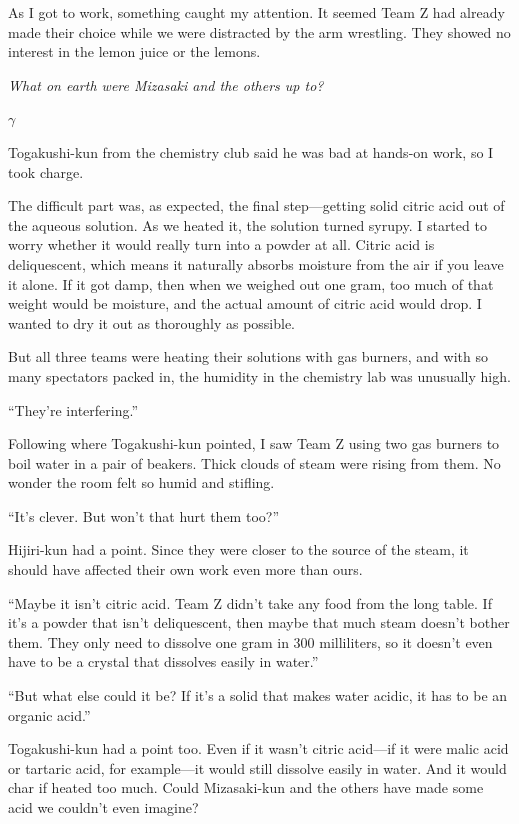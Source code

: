 \documentclass[
    a4paper,
    12pt,
    twoside,
    openany,
    UTF8,
    fontset=windows
]{ctexbook}
\begin{document}
As I got to work, something caught my attention. It seemed Team Z had already made their choice while we were distracted by the arm wrestling. They showed no interest in the lemon juice or the lemons.

\textit{What on earth were Mizasaki and the others up to?}

$\gamma$

Togakushi-kun from the chemistry club said he was bad at hands-on work, so I took charge.

The difficult part was, as expected, the final step---getting solid citric acid out of the aqueous solution. As we heated it, the solution turned syrupy. I started to worry whether it would really turn into a powder at all. Citric acid is deliquescent, which means it naturally absorbs moisture from the air if you leave it alone. If it got damp, then when we weighed out one gram, too much of that weight would be moisture, and the actual amount of citric acid would drop. I wanted to dry it out as thoroughly as possible.

But all three teams were heating their solutions with gas burners, and with so many spectators packed in, the humidity in the chemistry lab was unusually high.

``They're interfering.''

Following where Togakushi-kun pointed, I saw Team Z using two gas burners to boil water in a pair of beakers. Thick clouds of steam were rising from them. No wonder the room felt so humid and stifling.

``It's clever. But won't that hurt them too?''

Hijiri-kun had a point. Since they were closer to the source of the steam, it should have affected their own work even more than ours.

``Maybe it isn't citric acid. Team Z didn't take any food from the long table. If it's a powder that isn't deliquescent, then maybe that much steam doesn't bother them. They only need to dissolve one gram in 300 milliliters, so it doesn't even have to be a crystal that dissolves easily in water.''

``But what else could it be? If it's a solid that makes water acidic, it has to be an organic acid.''

Togakushi-kun had a point too. Even if it wasn't citric acid---if it were malic acid or tartaric acid, for example---it would still dissolve easily in water. And it would char if heated too much. Could Mizasaki-kun and the others have made some acid we couldn't even imagine?
\end{document}
